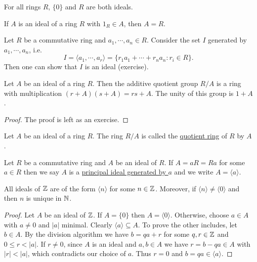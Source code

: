 \documentclass[11pt]{article}
\begin{document}
\begin{example}
    For all rings $R$, $\{0\}$ and $R$ are both ideals.
\end{example}

\begin{note}
    If $A$ is an ideal of a ring $R$ with $1_R\in A$, then $A=R$.
\end{note}

\begin{example}
    Let $R$ be a commutative ring and $a_1,\cdots,a_n\in R$. Consider the set $I$ generated by $a_1,\cdots,a_n$, i.e. $$I=\langle a_1,\cdots,a_r\rangle=\{r_1a_1+\cdots+r_na_n:r_i\in R\}.$$ Then one can show that $I$ is an ideal (exercise).
\end{example}

\begin{proposition}
    Let $A$ be an ideal of a ring $R$. Then the additive quotient group $R/A$ is a ring with multiplication $(r+A)(s+A)=rs+A$. The unity of this group is $1+A$.
\end{proposition}

\begin{proof}
    The proof is left as an exercise.
\end{proof}

\begin{definition}
    Let $A$ be an ideal of a ring $R$. The ring $R/A$ is called the \ul{quotient ring} of $R$ by $A$.
\end{definition}

\begin{definition}
    Let $R$ be a commutative ring and $A$ be an ideal of $R$. If $A=aR=Ra$ for some $a\in R$ then we say $A$ is a \ul{principal ideal generated by $a$} and we write $A=\langle a\rangle$.
\end{definition}

\begin{proposition}
    All ideals of $\mathbb{Z}$ are of the form $\langle n\rangle$ for some $n\in\mathbb{Z}$. Moreover, if $\langle n\rangle\neq\langle0\rangle$ and then $n$ is unique in $\mathbb{N}$.
\end{proposition}

\begin{proof}
    Let $A$ be an ideal of $\mathbb{Z}$. If $A=\{0\}$ then $A=\langle 0\rangle$. Otherwise, choose $a\in A$ with $a\neq 0$ and $|a|$ minimal. Clearly $\langle a\rangle\subseteq A$. To prove the other includes, let $b\in A$. By the division algorithm we have $b=qa+r$ for some $q,r\in\mathbb{Z}$ and $0\leq r<|a|$. If $r\neq0$, since $A$ is an ideal and $a,b\in A$ we have $r=b-qa\in A$ with $|r|<|a|$, which contradicts our choice of $a$. Thus $r=0$ and $b=qa\in\langle a\rangle$.
\end{proof}
\end{document}
